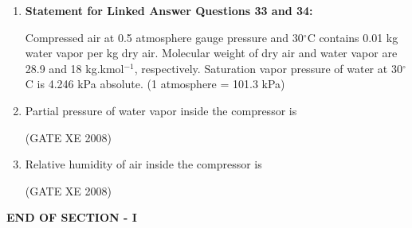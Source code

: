 \documentclass[12pt]{article}
\begin{document}
\begin{enumerate}
\item[] \textbf{Statement for Linked Answer Questions 33 and 34:}

Compressed air at 0.5 atmosphere gauge pressure and 30$^\circ$C contains 0.01 kg water vapor per kg dry air. Molecular weight of dry air and water vapor are 28.9 and 18 kg.kmol$^{-1}$, respectively. Saturation vapor pressure of water at 30$^\circ$C is 4.246 kPa absolute. (1 atmosphere = 101.3 kPa) \\

\item Partial pressure of water vapor inside the compressor is 

\begin{enumerate}
\end{enumerate}

(GATE XE 2008)

\item Relative humidity of air inside the compressor is

\begin{enumerate}
\end{enumerate}

(GATE XE 2008)

\end{enumerate}

\begin{center}
    \textbf{END OF SECTION - I}
\end{center}
\end{document}
